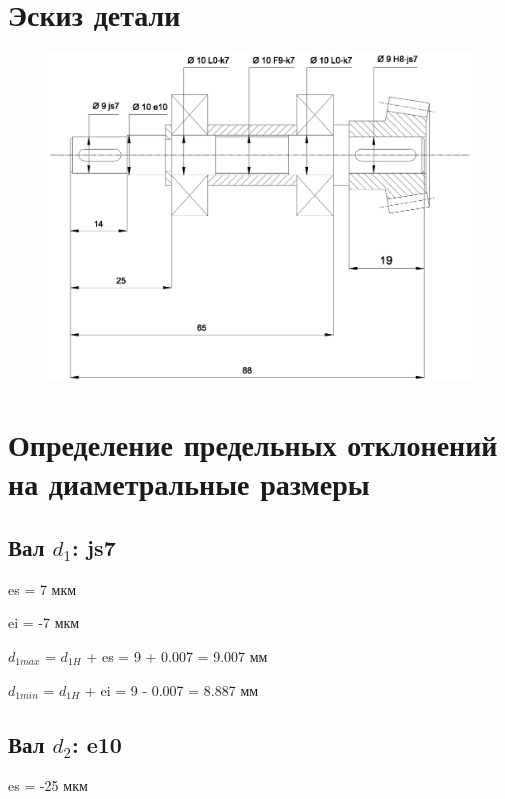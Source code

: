 \documentclass[a4paper,fontsize=12pt]{article}
\begin{document}
\section{Эскиз детали}

\begin{figure}[h]
    \centering
    \includegraphics[width=16cm]{images/draw1.eps}
    \label{fig:draw1}
\end{figure}

\newpage
\section{Определение предельных отклонений на диаметральные размеры}

\subsection{Вал $d_1$:  js7}
es = 7 мкм

ei = -7 мкм

$d_{1max}$ = $d_{1H}$ + es = 9 + 0.007 = 9.007 мм

$d_{1min}$ = $d_{1H}$ + ei = 9 - 0.007 = 8.887 мм

\subsection{Вал $d_2$:  e10}
es = -25 мкм
\end{document}
